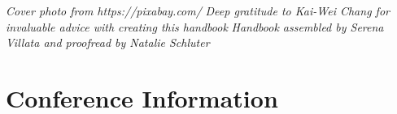 \documentclass[twoside,makeidx]{book}
\begin{document}





\thispagestyle{empty}
\vspace*{6in}
\begin{linez}
\emph{Cover photo from https://pixabay.com/}
\emph{Deep gratitude to Kai-Wei Chang for invaluable advice with creating this handbook}
    \emph{Handbook assembled by Serena Villata and proofread by Natalie Schluter}
\end{linez}



\frontmatter

\setcounter{tocdepth}{2}
\tableofcontents
\mainmatter

\chapter{Conference Information}

\clearpage


\clearpage%
\setheaders{}{}


\clearpage%
\setheaders{}{}

%


\clearpage


\cleardoublepage


\end{document}
